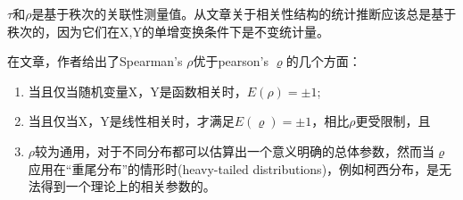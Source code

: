 \documentclass[UTF8]{ctexart}
\begin{document}
\textcolor[rgb]{1,0,0}{$\tau$和$\rho$是基于秩次的关联性测量值。从文章\cite{Genest2007}关于相关性结构的统计推断应该总是基于秩次的，因为它们在X,Y的单增变换条件下是不变统计量。}

在文章\cite{Genest2007}，作者给出了Spearman's $\rho$优于pearson's $\varrho$的几个方面：
\begin{enumerate}[1.]
    \item 当且仅当随机变量X，Y是函数相关时，$E(\rho) = \pm 1$;
    \item 当且仅当X，Y是线性相关时，才满足$E(\varrho) = \pm 1$，相比$\rho$更受限制，且
    \item $\rho$较为通用，对于不同分布都可以估算出一个意义明确的总体参数，然而当$\varrho$应用在``重尾分布''的情形时(heavy-tailed distributions)，例如柯西分布，是无法得到一个理论上的相关参数的。
\end{enumerate}


\end{document}
